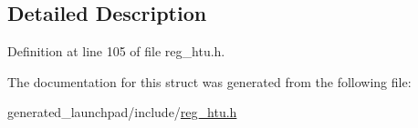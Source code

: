 \subsection{Detailed Description}


Definition at line 105 of file reg\+\_\+htu.\+h.



The documentation for this struct was generated from the following file\+:\begin{DoxyCompactItemize}
\item 
generated\+\_\+launchpad/include/\mbox{\hyperlink{reg__htu_8h}{reg\+\_\+htu.\+h}}\end{DoxyCompactItemize}
